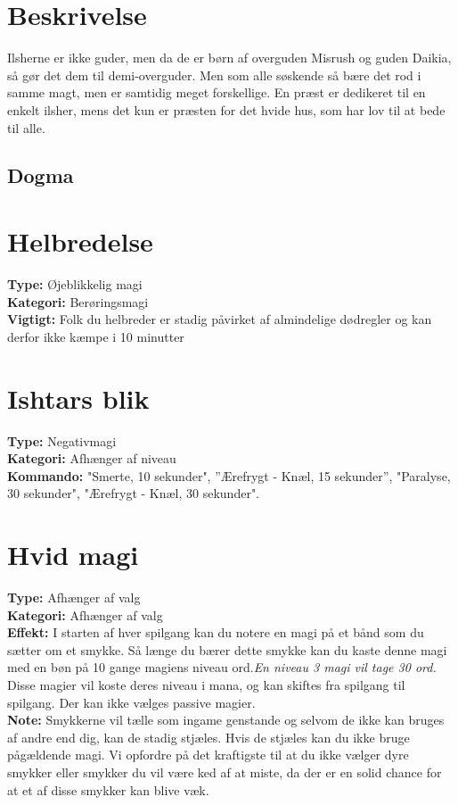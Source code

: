 \section{Beskrivelse}
Ilsherne er ikke guder, men da de er børn af overguden Misrush og guden Daikia, så gør det dem til demi-overguder. Men som alle søskende så bære det rod i samme magt, men er samtidig meget forskellige. En præst er dedikeret til en enkelt ilsher, mens det kun er præsten for det hvide hus, som har lov til at bede til alle.\\
\subsection{Dogma}

\section{Helbredelse}
\textbf{Type:} Øjeblikkelig magi \\
\textbf{Kategori:} Berøringsmagi\\
\textbf{Vigtigt:} Folk du helbreder er stadig påvirket af almindelige dødregler og kan derfor ikke kæmpe i 10 minutter


\section{Ishtars blik}
\textbf{Type:} Negativmagi\\
\textbf{Kategori:} Afhænger af niveau\\
\textbf{Kommando:} "Smerte, 10 sekunder", ”Ærefrygt - Knæl, 15 sekunder”, "Paralyse, 30 sekunder", "Ærefrygt - Knæl, 30 sekunder".


\section{Hvid magi}
\textbf{Type:} Afhænger af valg\\
\textbf{Kategori:} Afhænger af valg \\
\textbf{Effekt:} I starten af hver spilgang kan du notere en magi på et bånd som du sætter om et smykke. Så længe du bærer dette smykke kan du kaste denne magi med en bøn på 10 gange magiens niveau ord.\textit{En niveau 3 magi vil tage 30 ord.} Disse magier vil koste deres niveau i mana, og kan skiftes fra spilgang til spilgang. Der kan ikke vælges passive magier.\\
\textbf{Note:} Smykkerne vil tælle som ingame genstande og selvom de ikke kan bruges af andre end dig, kan de stadig stjæles. Hvis de stjæles kan du ikke bruge pågældende magi. Vi opfordre på det kraftigste til at du ikke vælger dyre smykker eller smykker du vil være ked af at miste, da der er en solid chance for at et af disse smykker kan blive væk.

